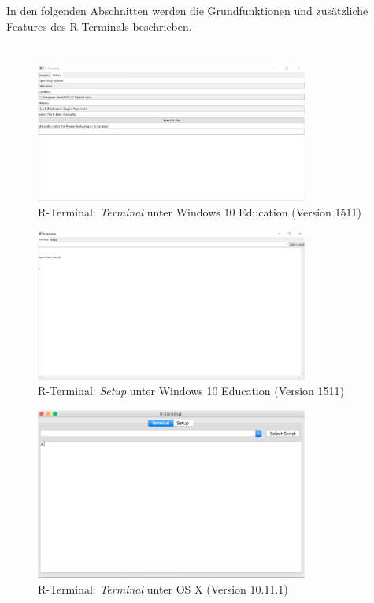 \documentclass[a4paper, 12pt]{report} %
\begin{document}

In den folgenden Abschnitten werden die Grundfunktionen und zusätzliche Features des R-Terminals beschrieben. 
\section{}

\begin{figure}[htpb]
\centering
\includegraphics[width=0.8\textwidth]{R-TerminalWindows}
\caption{R-Terminal: \textit{Terminal} unter Windows 10 Education (Version 1511)}
\label{rterminalwindows}
\end{figure}

\begin{figure}[htpb]
\centering
\includegraphics[width=0.8\textwidth]{rterminalwindows}
\caption{R-Terminal: \textit{Setup} unter Windows 10 Education (Version 1511)}
\label{rterminalwindows}
\end{figure}

\begin{figure}[htpb]
\centering
\includegraphics[width=0.8\textwidth]{R-Terminal}
\caption{R-Terminal: \textit{Terminal} unter OS X (Version 10.11.1)}
\label{rterminalmac}
\end{figure}
\end{document}

